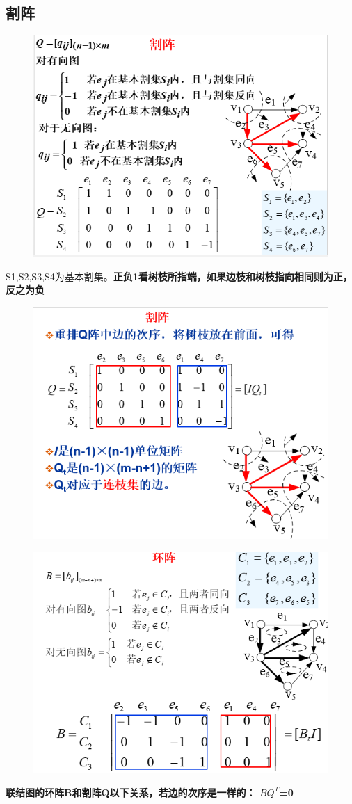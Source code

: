 \subsection{割阵}
\begin{figure}[H]
	\centering
	\includegraphics[width=0.7\linewidth]{figures/screenshot064}
	\caption{}
	\label{fig:screenshot064}
\end{figure}
S1,S2,S3,S4为基本割集。\textbf{正负1看树枝所指端，如果边枝和树枝指向相同则为正，反之为负}
\begin{figure}[H]
	\centering
	\includegraphics[width=0.7\linewidth]{figures/screenshot065}
	\caption{}
	\label{fig:screenshot065}
\end{figure}
\begin{figure}[H]
	\centering
	\includegraphics[width=0.7\linewidth]{figures/screenshot066}
	\caption{}
	\label{fig:screenshot066}
\end{figure}
\textbf{联结图的环阵B和割阵Q以下关系，若边的次序是一样的： $ BQ^T $=0
}
